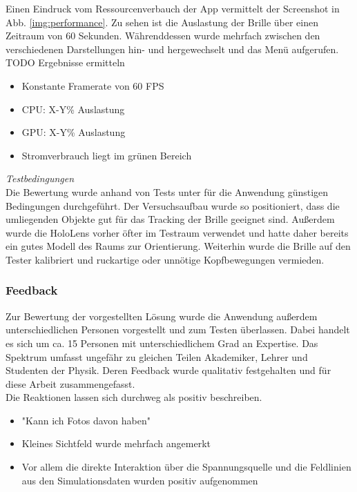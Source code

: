 Einen Eindruck vom Ressourcenverbauch der App vermittelt der Screenshot in Abb. \ref{img:performance}. Zu sehen ist die Auslastung der Brille über einen Zeitraum von 60 Sekunden. Währenddessen wurde mehrfach zwischen den verschiedenen Darstellungen hin- und hergewechselt und das Menü aufgerufen.\\

TODO Ergebnisse ermitteln
\begin{itemize}
	\setlength{\itemsep}{-1pt}
	\singlespacing
	\item Konstante Framerate von 60 FPS
	\item CPU: X-Y\% Auslastung
	\item GPU: X-Y\% Auslastung
	\item Stromverbrauch liegt im grünen Bereich
\end{itemize}

\textit{Testbedingungen}\\
Die Bewertung wurde anhand von Tests unter für die Anwendung günstigen Bedingungen durchgeführt. Der Versuchsaufbau wurde so positioniert, dass die umliegenden Objekte gut für das Tracking der Brille geeignet sind. Außerdem wurde die HoloLens vorher öfter im Testraum verwendet und hatte daher bereits ein gutes Modell des Raums zur Orientierung. Weiterhin wurde die Brille auf den Tester kalibriert und ruckartige oder unnötige Kopfbewegungen vermieden. 

\subsubsection{Feedback}
Zur Bewertung der vorgestellten Lösung wurde die Anwendung außerdem unterschiedlichen Personen vorgestellt und zum Testen überlassen. Dabei handelt es sich um ca. 15 Personen mit unterschiedlichem Grad an Expertise. Das Spektrum umfasst ungefähr zu gleichen Teilen Akademiker, Lehrer und Studenten der Physik. Deren Feedback wurde qualitativ festgehalten und für diese Arbeit zusammengefasst.\\

Die Reaktionen lassen sich durchweg als positiv beschreiben.


\begin{itemize}
	\item "Kann ich Fotos davon haben"
	\item Kleines Sichtfeld wurde mehrfach angemerkt
	\item Vor allem die direkte Interaktion über die Spannungsquelle und die Feldlinien aus den Simulationsdaten wurden positiv aufgenommen
\end{itemize}


